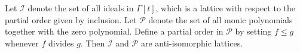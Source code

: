 Let $\mathcal{I}$ denote the set of all ideals in $\Gamma[t]$, which is a lattice with respect to the partial order given by inclusion. Let $\mathcal{P}$ denote the set of all monic polynomials together with the zero polynomial. Define a partial order in $\mathcal{P}$ by setting $f \leq g$ whenever $f$ divides $g$. Then $\mathcal{I}$ and $\mathcal{P}$ are anti-isomorphic lattices.
